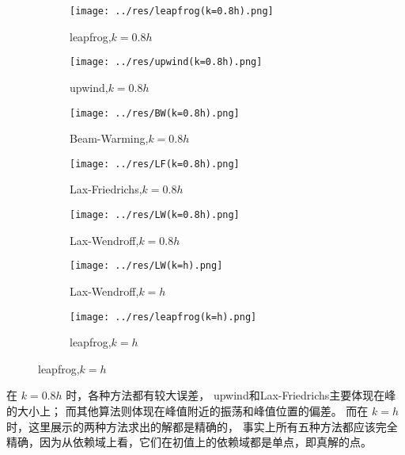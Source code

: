 \documentclass[lang=cn,a4paper,newtx,bibend=bibtex]{elegantpaper}
\begin{document}
\begin{figure}[H]
    \centering
    \begin{subfigure}[b]{0.30\textwidth}
        \texttt{[image: ../res/leapfrog(k=0.8h).png]}
        \caption{leapfrog,$k=0.8h$}
    \end{subfigure}
    \hfill
    \begin{subfigure}[b]{0.30\textwidth}
        \texttt{[image: ../res/upwind(k=0.8h).png]}
        \caption{upwind,$k=0.8h$}
    \end{subfigure}
    \hfill
    \begin{subfigure}[b]{0.30\textwidth}
        \texttt{[image: ../res/BW(k=0.8h).png]}
        \caption{Beam-Warming,$k=0.8h$}
    \end{subfigure}
    \begin{subfigure}[b]{0.23\textwidth}
        \texttt{[image: ../res/LF(k=0.8h).png]}
        \caption{Lax-Friedrichs,$k=0.8h$}
    \end{subfigure}
    \hfill
    \begin{subfigure}[b]{0.23\textwidth}
        \texttt{[image: ../res/LW(k=0.8h).png]}
        \caption{Lax-Wendroff,$k=0.8h$}
    \end{subfigure}
    \hfill
    \begin{subfigure}[b]{0.23\textwidth}
        \texttt{[image: ../res/LW(k=h).png]}
        \caption{Lax-Wendroff,$k=h$}
    \end{subfigure}
    \hfill
    \begin{subfigure}[b]{0.23\textwidth}
        \texttt{[image: ../res/leapfrog(k=h).png]}
        \caption{leapfrog,$k=h$}
    \end{subfigure}
  \end{figure}

在 $k=0.8h$ 时，各种方法都有较大误差，
upwind和Lax-Friedrichs主要体现在峰的大小上；
而其他算法则体现在峰值附近的振荡和峰值位置的偏差。
而在 $k=h$ 时，这里展示的两种方法求出的解都是精确的，
事实上所有五种方法都应该完全精确，因为从依赖域上看，它们在初值上的依赖域都是单点，即真解的点。
\end{document}

